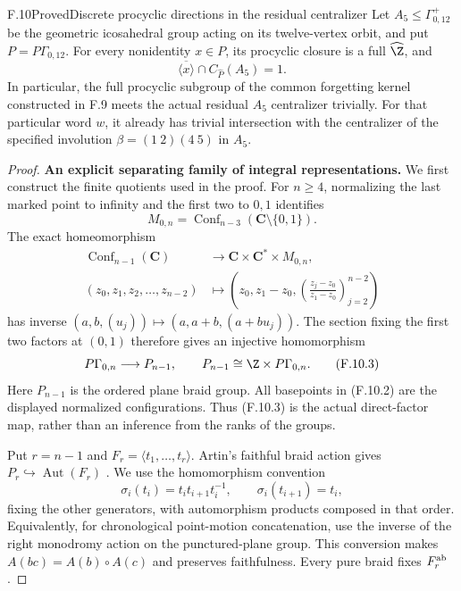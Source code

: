 \begin{claim}{F.10}{Proved}{Discrete procyclic directions in the residual centralizer}
Let $A_5\leq\Gamma^+_{0,12}$ be the geometric
icosahedral group acting on its twelve-vertex orbit,
and put $P=P\Gamma_{0,12}$.  For every nonidentity
$x\in P$, its procyclic closure is a full
$\widehat\Z$, and
\[
 \overline{\langle x\rangle}\cap
              C_{\widehat P}(A_5)=1.                  \tag{F.10.1}
\]
In particular, the full procyclic subgroup of the
common forgetting kernel constructed in F.9 meets
the actual residual $A_5$ centralizer trivially.
For that particular word $w$, it already has
trivial intersection with the centralizer of the
specified involution $\beta=(1\ 2)(4\ 5)$ in $A_5$.
\end{claim}
\begin{proof}
\textbf{An explicit separating family of integral representations.}
We first construct the finite quotients used in the
proof.  For $n\geq4$, normalizing the last marked
point to infinity and the first two to $0,1$
identifies
\[
 M_{0,n}=\operatorname{Conf}_{n-3}
                              (\mathbf C\setminus\{0,1\}).
\]
The exact homeomorphism
\[
\begin{split}
 \operatorname{Conf}_{n-1}(\mathbf C)
   &\longrightarrow\mathbf C\times\mathbf C^*\times M_{0,n},\\
 (z_0,z_1,z_2,\ldots,z_{n-2})
   &\longmapsto\left(z_0,z_1-z_0,
        \left(\frac{z_j-z_0}{z_1-z_0}\right)_{j=2}^{n-2}\right)
\end{split}                                                   \tag{F.10.2}
\]
has inverse $(a,b,(u_j))\mapsto(a,a+b,(a+bu_j))$.
The section fixing the first two factors at $(0,1)$
therefore gives an injective homomorphism
\[
          P\Gamma_{0,n}\longrightarrow P_{n-1},
 \qquad P_{n-1}\cong\Z\times P\Gamma_{0,n}.             \tag{F.10.3}
\]
Here $P_{n-1}$ is the ordered plane braid group.
All basepoints in (F.10.2) are the displayed normalized
configurations.  Thus (F.10.3) is the actual direct-factor
map, rather than an inference from the ranks of the groups.

Put $r=n-1$ and $F_r=\langle t_1,\ldots,t_r\rangle$.
Artin's faithful braid action gives
$P_r\hookrightarrow\operatorname{Aut}(F_r)$
\cite[Theorem~14]{A-Artin1947}.  We use the homomorphism
convention
\[
 \sigma_i(t_i)=t_it_{i+1}t_i^{-1},\qquad
 \sigma_i(t_{i+1})=t_i,
\]
fixing the other generators, with automorphism products
composed in that order.  Equivalently, for chronological
point-motion concatenation, use the inverse of the right
monodromy action on the punctured-plane group.  This
conversion makes $A(bc)=A(b)\circ A(c)$ and preserves
faithfulness.  Every pure braid fixes $F_r^{\rm ab}$.


\end{proof}
